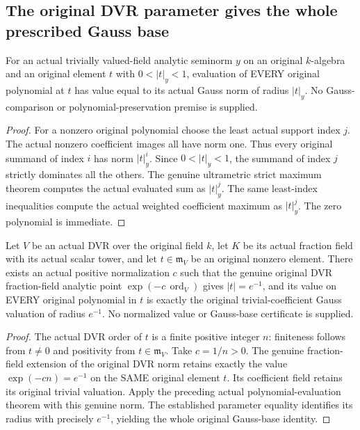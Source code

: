 \subsection{The original DVR parameter gives the whole prescribed Gauss base}

\begin{lemma}
\label{berkovich:actual-trivial-parameter-gauss-evaluation}
\leanok
For an actual trivially valued-field analytic seminorm $y$ on an original
$k$-algebra and an original element $t$ with $0<|t|_y<1$, evaluation of EVERY
original polynomial at $t$ has value equal to its actual Gauss norm of radius
$|t|_y$. No Gauss-comparison or polynomial-preservation premise is supplied.
\end{lemma}
\begin{proof}
For a nonzero original polynomial choose the least actual support index $j$.
The actual nonzero coefficient images all have norm one. Thus every original
summand of index $i$ has norm $|t|_y^i$. Since $0<|t|_y<1$, the summand of
index $j$ strictly dominates all the others. The genuine ultrametric strict
maximum theorem computes the actual evaluated sum as $|t|_y^j$. The same
least-index inequalities compute the actual weighted coefficient maximum as
$|t|_y^j$. The zero polynomial is immediate.
\end{proof}

\begin{theorem}
\label{berkovich:actual-dvr-normalized-parameter-gauss-base}
\leanok
{}
Let $V$ be an actual DVR over the original field $k$, let $K$ be its actual
fraction field with its actual scalar tower, and let $t\in\mathfrak m_V$ be
an original nonzero element. There exists an actual positive normalization
$c$ such that the genuine original DVR fraction-field analytic point
$\exp(-c\,\operatorname{ord}_V)$ gives $|t|=e^{-1}$, and its value on EVERY
original polynomial in $t$ is exactly the original trivial-coefficient Gauss
valuation of radius $e^{-1}$. No normalized value or Gauss-base certificate
is supplied.
\end{theorem}
\begin{proof}
The actual DVR order of $t$ is a finite positive integer $n$: finiteness follows
from $t\ne0$ and positivity from $t\in\mathfrak m_V$. Take $c=1/n>0$.
The genuine fraction-field extension of the original DVR norm retains exactly
the value $\exp(-c n)=e^{-1}$ on the SAME original element $t$.
Its coefficient field retains its original trivial valuation. Apply the
preceding actual polynomial-evaluation theorem with this genuine norm.
The established parameter equality identifies its radius with precisely
$e^{-1}$, yielding the whole original Gauss-base identity.
\end{proof}
